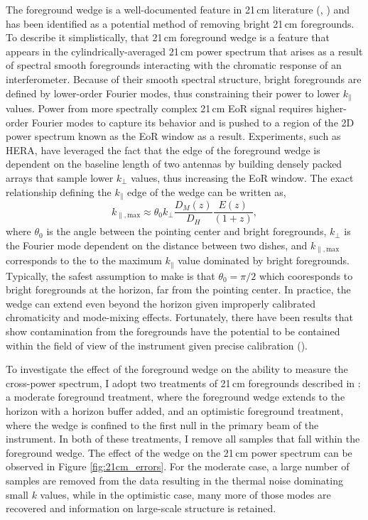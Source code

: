 The foreground wedge is a well-documented feature in 21\,cm literature (\cite{2010ApJ...724..526D}, \cite{2012ApJ...752..137M})
and has been identified as a potential method of removing bright 21\,cm foregrounds.
To describe it simplistically, that 21\,cm foreground wedge is a feature that appears
in the cylindrically-averaged 21\,cm power spectrum that arises as a result of
spectral smooth foregrounds interacting with the chromatic response of an interferometer.
Because of their smooth spectral structure, bright foregrounds are defined by lower-order
Fourier modes, thus constraining their power to lower $k_{\parallel}$ values.
Power from more spectrally complex 21\,cm EoR signal requires higher-order Fourier modes to capture
its behavior and is pushed to a region of the 2D power spectrum known as the EoR window as a result.
Experiments, such as HERA, have leveraged the fact that the edge of the foreground wedge is dependent
on the baseline length of two antennas by building densely packed arrays that sample
lower $k_{\perp}$ values, thus increasing the EoR window. The exact relationship
defining the $k_{\parallel}$ edge of the wedge can be written as,
\begin{equation}
    k_{\parallel, \textrm{max}} \approx \theta_{0} k_{\perp} \frac{D_{M} \left( z \right) }{D_H} \frac{E \left( z \right)}{\left(1 + z\right)},
\end{equation}
where $\theta_{0}$ is the angle between the pointing center and bright foregrounds, $k_{\perp}$ is the Fourier mode
dependent on the distance between two dishes, and $k_{\parallel, \textrm{max}}$ corresponds to the
to the maximum $k_{\parallel}$ value dominated by bright foregrounds.
Typically, the safest assumption to make is that $\theta_{0} = \pi / 2$ which cooresponds
to bright foregrounds at the horizon, far from the pointing center. In practice,
the wedge can extend even beyond the horizon given improperly calibrated chromaticity
and mode-mixing effects. Fortunately, there have been results that show contamination
from the foregrounds have the potential to be contained within the field of view
of the instrument given precise calibration (\cite{2014ApJ...782...66P}).

To investigate the effect of the foreground wedge on the ability to measure the cross-power spectrum,
I adopt two treatments of 21\,cm foregrounds described in \cite{2014ApJ...782...66P}: a moderate foreground treatment,
where the foreground wedge extends to the horizon with a horizon buffer added, and an optimistic foreground treatment, where the wedge
is confined to the first null in the primary beam of the instrument. In both of these treatments,
I remove all samples that fall within the foreground wedge. The effect of the
wedge on the 21\,cm power spectrum can be observed in Figure \ref{fig:21cm_errors}.
For the moderate case, a large number of samples are removed from the data resulting
in the thermal noise dominating small $k$ values, while in the optimistic case,
many more of those modes are recovered and information on large-scale structure is
retained.

